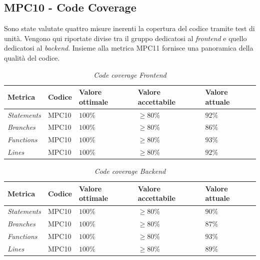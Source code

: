 \subsection{MPC10 - Code Coverage}
\label{s:mpc10}
Sono state valutate quattro misure inerenti la copertura del codice tramite test di unità.
Vengono qui riportate divise tra il gruppo dedicatosi al \textit{frontend} e quello dedicatosi al \textit{backend}.
Insieme alla metrica MPC11 fornisce una panoramica della qualità del codice.
\begin{table}[H]
    \centering
    \begin{tabularx}{\textwidth}{X|l|l|l|l}
        \hline
        \textbf{Metrica}    & \textbf{Codice} & \textbf{Valore ottimale} & \textbf{Valore accettabile} & \textbf{Valore attuale} \\
        \hline
        \textit{Statements} & MPC10           & $100\%$                  & $\ge 80\%$                  & $ 92\%$                 \\
        \hline
        \textit{Branches}   & MPC10           & $100\%$                  & $\ge 80\%$                  & $ 86\%$                 \\
        \hline
        \textit{Functions}  & MPC10           & $100\%$                  & $\ge 80\%$                  & $ 93\%$                 \\
        \hline
        \textit{Lines}      & MPC10           & $100\%$                  & $\ge 80\%$                  & $ 92\%$                 \\
        \hline
    \end{tabularx}
    \caption{\textit{Code coverage Frontend}}
\end{table}
\begin{table}[H]
    \centering
    \begin{tabularx}{\textwidth}{X|l|l|l|l}
        \hline
        \textbf{Metrica}    & \textbf{Codice} & \textbf{Valore ottimale} & \textbf{Valore accettabile} & \textbf{Valore attuale} \\
        \hline
        \textit{Statements} & MPC10           & $100\%$                  & $\ge 80\%$                  & $ 90\%$                 \\
        \hline
        \textit{Branches}   & MPC10           & $100\%$                  & $\ge 80\%$                  & $ 87\%$                 \\
        \hline
        \textit{Functions}  & MPC10           & $100\%$                  & $\ge 80\%$                  & $ 93\%$                 \\
        \hline
        \textit{Lines}      & MPC10           & $100\%$                  & $\ge 80\%$                  & $ 89\%$                 \\
        \hline
    \end{tabularx}
    \caption{\textit{Code coverage Backend}}
\end{table}


